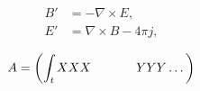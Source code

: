 $$
\begin{align}
        B'&=-\nabla \times E,\\
        E'&=\nabla \times B - 4\pi j,
\end{align}
$$

$$
\begin{align}
 A &=     \left(\int_t XXX       \right. \
   &\qquad \left.\vphantom{\int_t} YYY \dots \right)
\end{align}
$$
